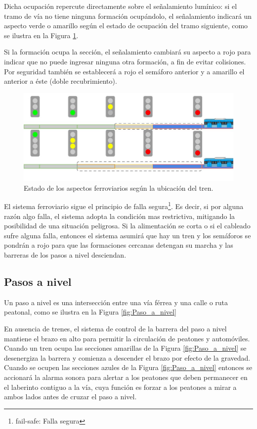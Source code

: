 			Dicha ocupación repercute directamente sobre el señalamiento lumínico: si el tramo de vía no tiene ninguna formación ocupándolo, el señalamiento indicará un aspecto verde o amarillo según el estado de ocupación del tramo siguiente, como se ilustra en la Figura \ref{fig:Recubrimiento}.
			
			Si la formación ocupa la sección, el señalamiento cambiará su aspecto a rojo para indicar que no puede ingresar ninguna otra formación, a fin de evitar colisiones. Por seguridad también se establecerá a rojo el semáforo anterior y a amarillo el anterior a éste (doble recubrimiento).
			
			\begin{figure}[h]
				\centering
				\includegraphics[scale=.4]{./Figures/Recubrimiento}
				\caption{Estado de los aspectos ferroviarios según la ubicación del tren.}
				\label{fig:Recubrimiento}
			\end{figure}
			
			El sistema ferroviario sigue el principio de falla segura\footnote{fail-safe: Falla segura}. Es decir, si por alguna razón algo falla, el sistema adopta la condición mas restrictiva, mitigando la posibilidad de una situación peligrosa. Si la alimentación se corta o si el cableado sufre alguna falla, entonces el sistema asumirá que hay un tren y los semáforos se pondrán a rojo para que las formaciones cercanas detengan su marcha y las barreras de los pasos a nivel desciendan.		
			
		\subsection{Pasos a nivel}
		
			Un paso a nivel es una intersección entre una vía férrea y una calle o ruta peatonal, como se ilustra en la Figura \ref{fig:Paso_a_nivel}
			
			En ausencia de trenes, el sistema de control de la barrera del paso a nivel mantiene el brazo en alto para permitir la circulación de peatones y automóviles. Cuando un tren ocupa las secciones amarillas de la Figura \ref{fig:Paso_a_nivel} se desenergiza la barrera y comienza a descender el brazo por efecto de la gravedad. Cuando se ocupen las secciones azules de la Figura \ref{fig:Paso_a_nivel} entonces se accionará la alarma sonora para alertar a los peatones que deben permanecer en el laberinto contiguo a la vía, cuya función es forzar a los peatones a mirar a ambos lados antes de cruzar el paso a nivel.
			
